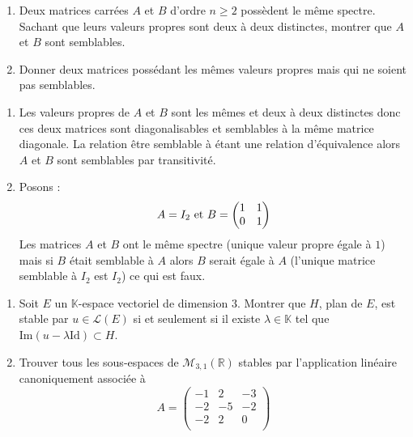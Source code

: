 \documentclass[a4paper,10pt]{report}
\begin{document}
\begin{Exercice}{}
\begin{enumerate}
\item Deux matrices carrées $A$ et $B$ d'ordre $n \geq 2$ possèdent le même spectre. Sachant que leurs valeurs propres sont deux à deux distinctes, montrer que $A$ et $B$ sont semblables.
\item Donner deux matrices possédant les mêmes valeurs propres mais qui ne soient pas semblables.
\end{enumerate}
\end{Exercice} 

\corr \begin{enumerate}
\item Les valeurs propres de $A$ et $B$ sont les mêmes et deux à deux distinctes donc ces deux matrices sont diagonalisables et semblables à la même matrice diagonale. La relation \og être semblable à \fg étant une relation d'équivalence alors $A$ et $B$ sont semblables par transitivité.
\item Posons :
$$ A = I_2 \hbox{ et } B = \begin{pmatrix}
1 & 1 \\
0 & 1 
\end{pmatrix}$$
Les matrices $A$ et $B$ ont le même spectre (unique valeur propre égale à $1$) mais si $B$ était semblable à $A$ alors $B$ serait égale à $A$ (l'unique matrice semblable à $I_2$ est $I_2$) ce qui est faux.
\end{enumerate}

\begin{Exercice}{} \begin{enumerate}
\item Soit $E$ un $\mathbb{K}$-espace vectoriel de dimension $3$. Montrer que $H$, plan de $E$, est stable par $u \in \mathcal{L}(E)$ si et seulement si il existe $\lambda \in \mathbb{K}$ tel que $\textrm{Im}(u- \lambda \textrm{Id}) \subset H$.
\item Trouver tous les sous-espaces de $\mathcal{M}_{3,1}(\mathbb{R})$ stables par l'application linéaire canoniquement associée à 
$$A= \begin{pmatrix}
-1 & 2 & -3 \\
-2 & -5 & -2 \\
-2 & 2 & 0 \\
\end{pmatrix} $$
\end{enumerate}
\end{Exercice}
\end{document}
